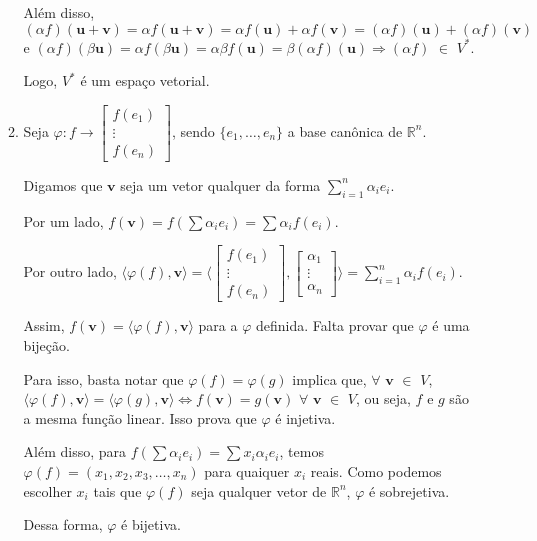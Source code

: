 \documentclass[leqno]{article}
\begin{document}
\begin{enumerate}
\begin{enumerate}
        Além disso, $(\alpha f)(\textbf{u}+\textbf{v})=\alpha f(\textbf{u}+\textbf{v})=\alpha f(\textbf{u})+\alpha f(\textbf{v})=(\alpha f)(\textbf{u})+(\alpha f)(\textbf{v})$ e $(\alpha f)(\beta\textbf{u})=\alpha f(\beta\textbf{u})=\alpha\beta f(\textbf{u})=\beta(\alpha f)(\textbf{u})\Rightarrow (\alpha f)$ $\in$ $V^*$.
        
        Logo, $V^*$ é um espaço vetorial.
        
        \item Seja $\varphi: f\rightarrow\begin{bmatrix}
        f(e_1)\\
        \vdots\\
        f(e_n)
        \end{bmatrix}$, sendo $\{e_1, \dots, e_n\}$ a base canônica de $\mathbb{R}^n$.
        
        Digamos que $\textbf{v}$ seja um vetor qualquer da forma $\sum_{i=1}^n \alpha_ie_i$.
        
        Por um lado, $f(\textbf{v})=f(\sum \alpha_ie_i)=\sum \alpha_if(e_i)$.
        
        Por outro lado, $\langle\varphi(f),\textbf{v} \rangle=\langle\begin{bmatrix}
        f(e_1)\\
        \vdots\\
        f(e_n)
        \end{bmatrix},\begin{bmatrix}
        \alpha_1\\
        \vdots\\
        \alpha_n
        \end{bmatrix}\rangle=\sum_{i=1}^n \alpha_if(e_i)$.
        
        Assim, $f(\textbf{v})=\langle\varphi(f),\textbf{v}\rangle$ para a $\varphi$ definida. Falta provar que $\varphi$ é uma bijeção.
        
        Para isso, basta notar que $\varphi(f)=\varphi(g)$ implica que, $\forall$ $\textbf{v}$ $\in$ $V$, $\langle\varphi(f), \textbf{v}\rangle=\langle\varphi(g),\textbf{v}\rangle\iff f(\textbf{v})=g(\textbf{v})$ $\forall$ $\textbf{v}$ $\in$ $V$, ou seja, $f$ e $g$ são a mesma função linear. Isso prova que $\varphi$ é injetiva.
        
        Além disso, para $f(\sum\alpha_ie_i)=\sum x_i\alpha_ie_i$, temos $\varphi(f)=(x_1,x_2,x_3,\dots,x_n)$ para quaiquer $x_i$ reais. Como podemos escolher $x_i$ tais que $\varphi(f)$ seja qualquer vetor de $\mathbb{R}^n$, $\varphi$ é sobrejetiva.
        
        Dessa forma, $\varphi$ é bijetiva.
    \end{enumerate}
    
\end{enumerate}

 
\end{document}
